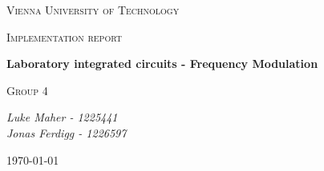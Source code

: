 
\begin{titlepage}
	\centering
	{\scshape\LARGE Vienna University of Technology \par}
	\vspace{1cm}
	{\scshape\Large Implementation report \par}
	\vspace{1.5cm}
	{\huge\bfseries Laboratory integrated circuits - Frequency Modulation \par}
	\vspace{2cm}
	{\scshape\Large Group 4 \par}
	\vspace{1.5cm}
	{\Large\itshape Luke Maher - 1225441 \\ Jonas Ferdigg - 1226597 \par}
	\vfill

	{\large \today\par}
\end{titlepage}

